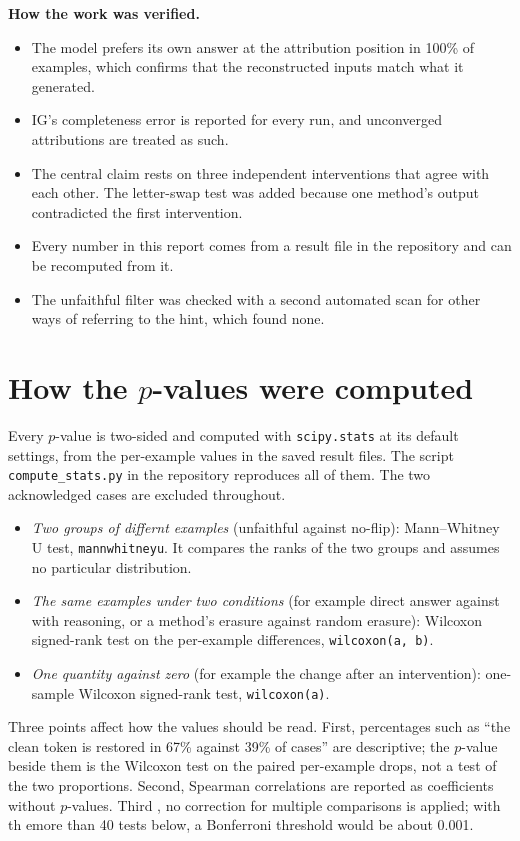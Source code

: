 \documentclass[10pt,a4paper,twocolumn]{article}
\newcommand{\para}[1]{\textbf{#1}}
\begin{document}
\para{How the work was verified.}
\begin{itemize}
\item The model prefers its own answer at the attribution position in 100\% of examples, which confirms that the reconstructed inputs match what it generated.
\item IG's completeness error is reported for every run, and unconverged attributions are treated as such.
\item The central claim rests on three independent interventions that agree with each other. The letter-swap test was added because one method's output contradicted the first intervention.
\item Every number in this report comes from a result file in the repository and can be recomputed from it.
\item The unfaithful filter was checked with a second automated scan for other ways of referring to the hint, which found none.
\end{itemize}

\section{How the $p$-values were computed}
\label{app:stats}

Every $p$-value is two-sided and computed with \texttt{scipy.stats} at its default settings, from the per-example values in the saved result files. The script \texttt{compute\_stats.py} in the repository reproduces all of them. The two acknowledged cases are excluded throughout.

\begin{itemize}
\item \emph{Two groups of differnt examples} (unfaithful against no-flip): Mann--Whitney U test, \texttt{mannwhitneyu}. It compares the ranks of the two groups and assumes no particular distribution.
\item \emph{The same examples under two conditions} (for example direct answer against with reasoning, or a method's erasure against random erasure): Wilcoxon signed-rank test on the per-example differences, \texttt{wilcoxon(a, b)}.
\item \emph{One quantity against zero} (for example the change after an intervention): one-sample Wilcoxon signed-rank test, \texttt{wilcoxon(a)}.
\end{itemize}

Three points affect how the values should be  read. First, percentages such as ``the clean token is restored in 67\% against 39\% of cases'' are descriptive; the $p$-value beside them is the Wilcoxon test on the paired per-example drops, not a test of the two proportions. Second, Spearman correlations are reported as coefficients without $p$-values. Third  , no correction for multiple comparisons is applied; with th emore than 40 tests below, a Bonferroni threshold would be about 0.001.
\end{document}
